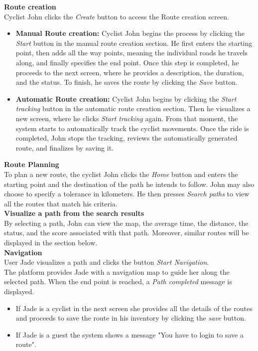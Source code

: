 \textbf{Route creation} \\[5pt]
Cyclist John clicks the  \textit{Create} button to access the Route creation screen.
\begin{itemize}
    \item \textbf{Manual Route creation:}
Cyclist John begins the process by clicking the \textit{Start} button in the manual route creation section. He first enters the starting point, then adds all the way points, meaning the individual roads he travels along, and finally specifies the end point.
Once this step is completed, he proceeds to the next screen, where he provides a description, the duration, and the status.
To finish, he saves the route by clicking the \textit{Save} button.
    \item \textbf{Automatic Route creation:}
Cyclist John begins by clicking the \textit{Start tracking} button in the automatic route creation section. Then he visualizes a new screen, where he clicks \textit{Start tracking} again. From that moment, the system starts to automatically track the cyclist movements. Once the ride is completed, John stops the tracking, reviews the automatically generated route, and finalizes by saving it.
\end{itemize}
\textbf{Route Planning} \\[5pt]
To plan a new route, the cyclist John clicks the \textit{Home} button and enters the starting point and the destination of the path he intends to follow. John may also choose to specify a tolerance in kilometers.
He then presses \textit{Search paths} to view all the routes that match his criteria. \\[8pt]
\textbf{Visualize a path from the search results} \\ [5pt]
By selecting a path, John can view the map, the average time, the distance, the status, and the score associated with that path. Moreover, similar routes will be displayed in the section below. \\[8pt]
\textbf{Navigation} \\ [5pt]
User Jade visualizes a path and clicks the button \textit{Start Navigation}. 
\\The platform provides Jade with a navigation map to guide her along the selected path. When the end point is reached, a \textit{Path completed} message is displayed.
\begin{itemize}
    \item If Jade is a cyclist in the next screen she provides all the details of the routes and proceeds to save the route in his inventory by clicking the \textit{save} button.
    \item If Jade is a guest the system shows a message "You have to login to save a route".
\end{itemize}
